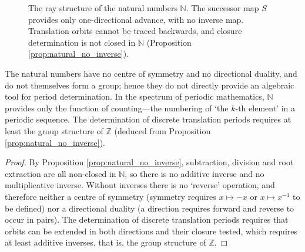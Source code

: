 \begin{figure}[htbp]
    \centering
    \caption{The ray structure of the natural numbers $\mathbb{N}$. The successor map $S$ provides only one-directional advance, with no inverse map. Translation orbits cannot be traced backwards, and closure determination is not closed in $\mathbb{N}$ (Proposition \ref{prop:natural_no_inverse}).}
    \label{fig:natural_ray}
\end{figure}
\begin{corollary}\label{cor:natural_period}
The natural numbers have no centre of symmetry and no directional duality, and do not themselves form a group; hence they do not directly provide an algebraic tool for period determination. In the spectrum of periodic mathematics, $\mathbb{N}$ provides only the function of counting---the numbering of `the $k$-th element' in a periodic sequence. The determination of discrete translation periods requires at least the group structure of $\mathbb{Z}$ (deduced from Proposition \ref{prop:natural_no_inverse}).
\end{corollary}

\begin{proof}
By Proposition \ref{prop:natural_no_inverse}, subtraction, division and root extraction are all non-closed in $\mathbb{N}$, so there is no additive inverse and no multiplicative inverse. Without inverses there is no `reverse' operation, and therefore neither a centre of symmetry (symmetry requires $x \mapsto -x$ or $x \mapsto x^{-1}$ to be defined) nor a directional duality (a direction requires forward and reverse to occur in pairs). The determination of discrete translation periods requires that orbits can be extended in both directions and their closure tested, which requires at least additive inverses, that is, the group structure of $\mathbb{Z}$.
\end{proof}

